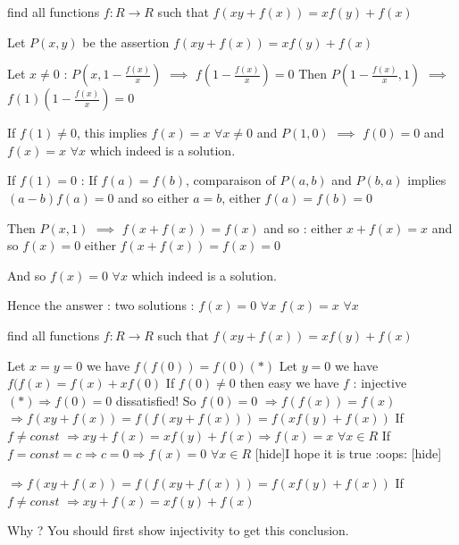 \begin{solution}
	\begin{tcolorbox}find all functions $f : R \longrightarrow R$ such that
$f(xy+f(x))=xf(y)+f(x)$\end{tcolorbox}
Let $P(x,y)$ be the assertion $f(xy+f(x))=xf(y)+f(x)$

Let $x\ne 0$ : 
$P(x,1-\frac{f(x)}x)$ $\implies$ $f(1-\frac{f(x)}x)=0$
Then $P(1-\frac{f(x)}x,1)$ $\implies$ $f(1)(1-\frac{f(x)}x)=0$

If $f(1)\ne 0$, this implies $f(x)=x$ $\forall x\ne 0$ and $P(1,0)$ $\implies$ $f(0)=0$ and $f(x)=x$ $\forall x$ which indeed is a solution.

If $f(1)=0$ :
If $f(a)=f(b)$, comparaison of $P(a,b)$ and $P(b,a)$ implies $(a-b)f(a)=0$ and so either $a=b$, either $f(a)=f(b)=0$

Then $P(x,1)$ $\implies$ $f(x+f(x))=f(x)$ and so :
either $x+f(x)=x$ and so $f(x)=0$
either $f(x+f(x))=f(x)=0$

And so $f(x)=0$ $\forall x$ which indeed is a solution.

Hence the answer : two solutions :
$f(x)=0$ $\forall x$
$f(x)=x$ $\forall x$
\end{solution}



\begin{solution}
	\begin{tcolorbox}find all functions $f : R \longrightarrow R$ such that
$f(xy+f(x))=xf(y)+f(x)$\end{tcolorbox}

Let $x=y=0$ we have $f(f(0))=f(0) (*)$
Let $y=0$ we have $f(f(x)=f(x)+xf(0)$
If $ f(0) \neq 0$   then easy we have $f$ : injective
$(*) \Rightarrow f(0)=0$ dissatisfied!
So $f(0)=0$
$\Rightarrow f(f(x))=f(x) $
$\Rightarrow f(xy+f(x))=f(f(xy+f(x)))=f(xf(y)+f(x))$
If $f \neq const $ $\Rightarrow xy+f(x)=xf(y)+f(x) \Rightarrow f(x)=x$ $ \forall x \in R$
If $ f = const =c \Rightarrow c=0 \Rightarrow f(x)=0$ $ \forall x \in R $
[hide]I hope it is true :oops: [\/hide]
\end{solution}



\begin{solution}
	\begin{tcolorbox} $\Rightarrow f(xy+f(x))=f(f(xy+f(x)))=f(xf(y)+f(x))$
If $f \neq const $ $\Rightarrow xy+f(x)=xf(y)+f(x)$\end{tcolorbox}
Why ?
You should first show injectivity to get this conclusion.
\end{solution}



